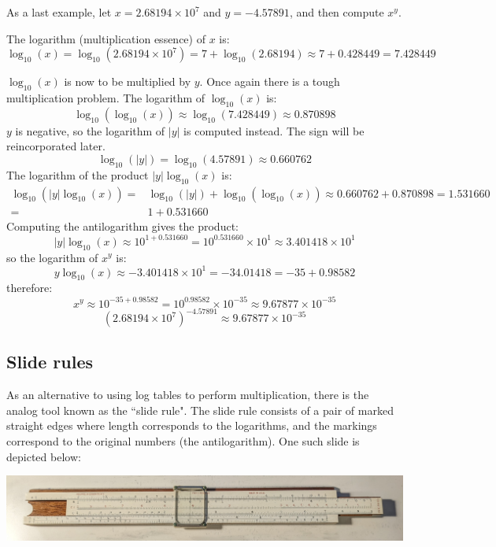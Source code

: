 \documentclass{article}
\begin{document}
\begin{description}
As a last example, let \(x = 2.68194 \times 10^7\) and \(y = -4.57891\), and then compute \(x^y\). 

The logarithm (multiplication essence) of \(x\) is: 
\[\log_{10}(x) = \log_{10}(2.68194 \times 10^7) = 7 + \log_{10}(2.68194) \approx 7 + 0.428449 = 7.428449\]

\(\log_{10}(x)\) is now to be multiplied by \(y\). Once again there is a tough multiplication problem. The logarithm of \(\log_{10}(x)\) is:
\[\log_{10}(\log_{10}(x)) \approx \log_{10}(7.428449) \approx 0.870898\]
\(y\) is negative, so the logarithm of \(|y|\) is computed instead. The sign will be reincorporated later. 
\[\log_{10}(|y|) = \log_{10}(4.57891) \approx 0.660762\]
The logarithm of the product \(|y|\log_{10}(x)\) is:
\begin{align*}
\log_{10}(|y|\log_{10}(x)) = & \log_{10}(|y|) + \log_{10}(\log_{10}(x)) \approx 0.660762 + 0.870898 = 1.531660 \\
= & 1 + 0.531660
\end{align*}
Computing the antilogarithm gives the product:
\[|y|\log_{10}(x) \approx 10^{1 + 0.531660} = 10^{0.531660} \times 10^1 \approx 3.401418 \times 10^1\]
so the logarithm of \(x^y\) is:
\[y\log_{10}(x) \approx -3.401418 \times 10^1 = -34.01418 = -35 + 0.98582\]
therefore:
\[x^y \approx 10^{-35 + 0.98582} = 10^{0.98582} \times 10^{-35} \approx 9.67877 \times 10^{-35}\]
\[(2.68194 \times 10^7)^{-4.57891} \approx 9.67877 \times 10^{-35}\]

\end{description}



\subsection*{Slide rules}

As an alternative to using log tables to perform multiplication, there is the analog tool known as the ``slide rule". The slide rule consists of a pair of marked straight edges where length corresponds to the logarithms, and the markings correspond to the original numbers (the antilogarithm). One such slide is depicted below:

\begin{center}
\includegraphics[width = \textwidth]{slide_rule_picture.jpg}
\end{center}    
\end{document}
